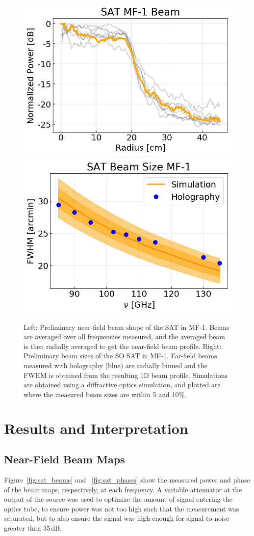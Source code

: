  \begin{figure}[t!]
    \centering
    \includegraphics[width = .47\textwidth]{Figures/sat_radbin.png}
    \includegraphics[width = .47\textwidth]{Figures/sat_fwhm.png}
    \caption{Left: Preliminary near-field beam shape of the SAT in MF-1.  Beams are averaged over all frequencies measured, and the averaged beam is then radially averaged to get the near-field beam profile.  Right: Preliminary beam sizes of the SO SAT in MF-1.  Far-field beams measured with holography (blue) are radially binned and the FWHM is obtained from the resulting 1D beam profile.  Simulations are obtained using a diffractive optics simulation, and plotted are where the measured beam sizes are within 5 and 10\%.}
    \label{fig:sat_fwhm}
\end{figure}

\section{Results and Interpretation}
\label{sec:sat_results}

\subsection{Near-Field Beam Maps}
Figure~\ref{fig:sat_beams} and ~\ref{fig:sat_phases} show the measured power and phase of the beam maps, respectively, at each frequency.   A variable attenuator at the output of the source was used to optimize the amount of signal entering the optics tube, to ensure power was not too high such that the measurement was saturated, but to also ensure the signal was high enough for signal-to-noise greater than 35\,dB.


